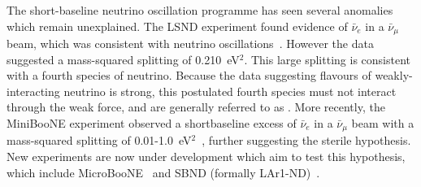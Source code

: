 \newline
\newline
The short-baseline neutrino oscillation programme has seen several anomalies~\cite{ShortBaseLineAnomaly} which remain unexplained.  The LSND experiment found evidence of $\bar{\nu}_e$ in a $\bar{\nu}_\mu$ beam, which was consistent with neutrino oscillations~\cite{Aguilar:2001ty}.  However the data suggested a mass-squared splitting of 0.210~eV$^2$.  This large splitting is consistent with a fourth species of neutrino.  Because the data suggesting  flavours of weakly-interacting neutrino is strong, this postulated fourth species must not interact through the weak force, and are generally referred to as .  More recently, the MiniBooNE experiment observed a  shortbaseline excess of $\bar{\nu}_e$ in a $\bar{\nu}_\mu$ beam with a mass-squared splitting of 0.01-1.0~eV$^2$~\cite{Aguilar-Arevalo:2013pmq}, further suggesting the sterile hypothesis.  New experiments are now under development which aim to test this hypothesis, which include MicroBooNE~\cite{2011arXiv1110.1604I} and SBND (formally LAr1-ND)~\cite{Adams:2013uaa}.

